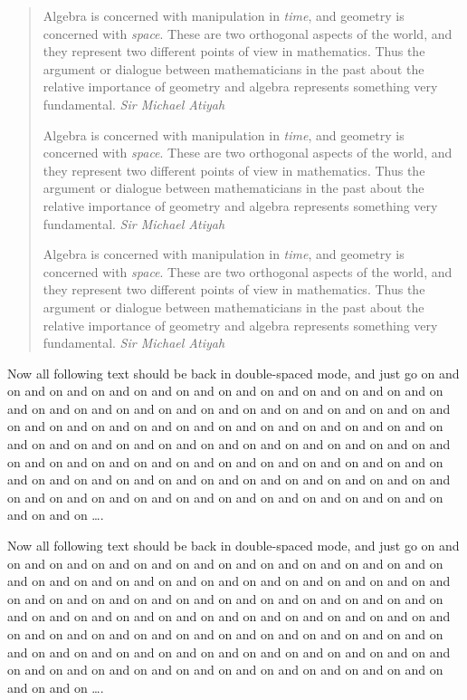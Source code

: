 \begin{quotation}
    \color{utahred}
    Algebra is concerned with manipulation in
    \emph{time}, and geometry is concerned with
    \emph{space}. These are two orthogonal aspects
    of the world, and they represent two different
    points of view in mathematics.  Thus the
    argument or dialogue between mathematicians in
    the past about the relative importance of
    geometry and algebra represents something very
    fundamental.
    \hfill
    \emph{Sir Michael Atiyah}

    Algebra is concerned with manipulation in
    \emph{time}, and geometry is concerned with
    \emph{space}. These are two orthogonal aspects
    of the world, and they represent two different
    points of view in mathematics.  Thus the
    argument or dialogue between mathematicians in
    the past about the relative importance of
    geometry and algebra represents something very
    fundamental.
    \hfill
    \emph{Sir Michael Atiyah}

    Algebra is concerned with manipulation in
    \emph{time}, and geometry is concerned with
    \emph{space}. These are two orthogonal aspects
    of the world, and they represent two different
    points of view in mathematics.  Thus the
    argument or dialogue between mathematicians in
    the past about the relative importance of
    geometry and algebra represents something very
    fundamental.
    \hfill
    \emph{Sir Michael Atiyah}
\end{quotation}


Now all following text should be back in
double-spaced mode, and just go on and on and on
and on and on and on and on and on and on and on
and on and on and on and on and on and on and on
and on and on and on and on and on and on and on
and on and on and on and on and on and on and on
and on and on and on and on and on and on and on
and on and on and on and on and on and on and on
and on and on and on and on and on and on and on
and on and on and on and on and on and on and on
and on and on and on and on and on and on and on
and on and on and on and on and on and on and on
and on and on and on and on \ldots{}.


Now all following text should be back in
double-spaced mode, and just go on and on and on
and on and on and on and on and on and on and on
and on and on and on and on and on and on and on
and on and on and on and on and on and on and on
and on and on and on and on and on and on and on
and on and on and on and on and on and on and on
and on and on and on and on and on and on and on
and on and on and on and on and on and on and on
and on and on and on and on and on and on and on
and on and on and on and on and on and on and on
and on and on and on and on and on and on and on
and on and on and on and on \ldots{}.

